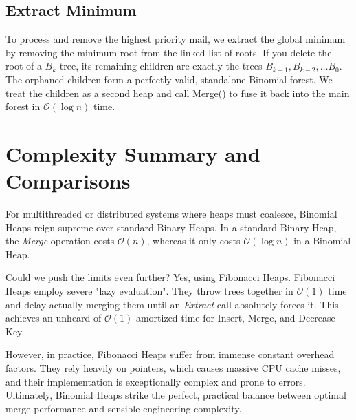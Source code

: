\documentclass[11pt, a4paper]{report}
\begin{document}
\subsection{Extract Minimum}
To process and remove the highest priority mail, we extract the global minimum by removing the minimum root from the linked list of roots. If you delete the root of a $B_k$ tree, its remaining children are exactly the trees $B_{k-1}, B_{k-2}, \dots B_0$. The orphaned children form a perfectly valid, standalone Binomial forest. We treat the children as a second heap and call Merge() to fuse it back into the main forest in $\mathcal{O}(\log n)$ time.

\section{Complexity Summary and Comparisons}
For multithreaded or distributed systems where heaps must coalesce, Binomial Heaps reign supreme over standard Binary Heaps. In a standard Binary Heap, the \textit{Merge} operation costs $\mathcal{O}(n)$, whereas it only costs $\mathcal{O}(\log n)$ in a Binomial Heap. 

Could we push the limits even further? Yes, using Fibonacci Heaps. Fibonacci Heaps employ severe "lazy evaluation". They throw trees together in $\mathcal{O}(1)$ time and delay actually merging them until an \textit{Extract} call absolutely forces it. This achieves an unheard of $\mathcal{O}(1)$ amortized time for Insert, Merge, and Decrease Key. 

However, in practice, Fibonacci Heaps suffer from immense constant overhead factors. They rely heavily on pointers, which causes massive CPU cache misses, and their implementation is exceptionally complex and prone to errors. Ultimately, Binomial Heaps strike the perfect, practical balance between optimal merge performance and sensible engineering complexity.
\end{document}
